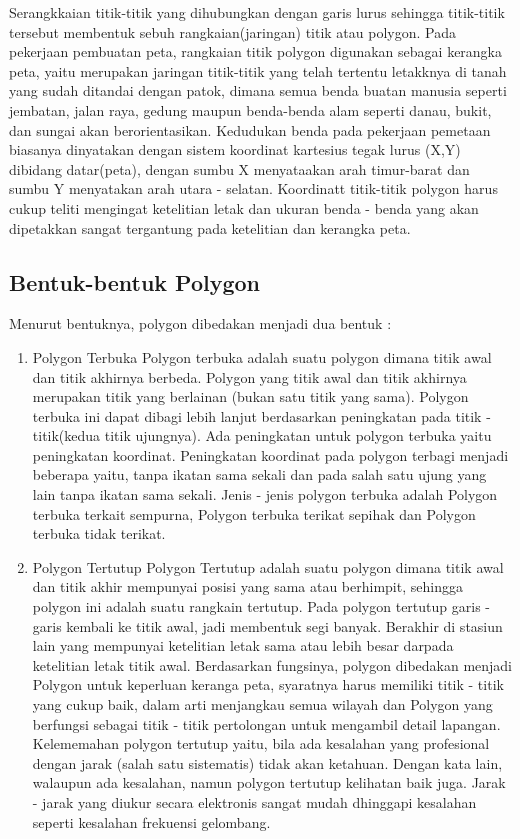 Serangkkaian titik-titik yang dihubungkan dengan garis lurus sehingga titik-titik tersebut membentuk sebuh rangkaian(jaringan) titik atau polygon. Pada pekerjaan pembuatan peta, rangkaian titik polygon digunakan sebagai  kerangka peta, yaitu merupakan jaringan titik-titik yang telah tertentu letakknya di tanah yang sudah ditandai dengan patok, dimana semua benda buatan manusia seperti jembatan, jalan raya, gedung maupun benda-benda alam seperti danau, bukit, dan sungai akan berorientasikan. Kedudukan benda pada pekerjaan pemetaan biasanya dinyatakan dengan sistem koordinat  kartesius tegak lurus (X,Y) dibidang datar(peta), dengan sumbu X menyataakan arah timur-barat dan sumbu Y menyatakan arah utara - selatan. Koordinatt titik-titik polygon harus cukup teliti mengingat ketelitian letak dan ukuran benda - benda yang akan dipetakkan sangat tergantung pada ketelitian dan kerangka peta.

\subsection{Bentuk-bentuk Polygon}
Menurut bentuknya, polygon dibedakan menjadi dua bentuk :
\begin{enumerate}
\item Polygon Terbuka
Polygon terbuka adalah suatu polygon dimana titik awal dan titik akhirnya berbeda. Polygon yang titik awal dan titik akhirnya merupakan titik yang berlainan (bukan satu titik yang sama). Polygon terbuka ini dapat dibagi lebih lanjut berdasarkan peningkatan pada titik - titik(kedua titik ujungnya). Ada peningkatan untuk polygon terbuka yaitu peningkatan koordinat. Peningkatan koordinat pada polygon terbagi menjadi beberapa yaitu, tanpa ikatan sama sekali dan pada salah satu ujung yang lain tanpa ikatan sama sekali. Jenis - jenis polygon terbuka adalah Polygon terbuka terkait sempurna, Polygon terbuka terikat sepihak dan Polygon terbuka tidak terikat.

\item Polygon Tertutup
Polygon Tertutup adalah suatu polygon dimana titik awal dan titik akhir mempunyai posisi yang sama atau berhimpit, sehingga polygon ini adalah suatu rangkain tertutup. Pada polygon tertutup garis - garis kembali ke titik awal, jadi membentuk segi banyak. Berakhir di stasiun lain yang mempunyai ketelitian letak sama atau lebih besar darpada ketelitian letak titik awal.
Berdasarkan fungsinya, polygon dibedakan menjadi Polygon untuk keperluan keranga peta, syaratnya harus memiliki titik - titik yang cukup baik, dalam arti menjangkau semua wilayah dan Polygon yang berfungsi sebagai titik - titik pertolongan untuk mengambil detail lapangan.
Kelememahan polygon tertutup yaitu, bila ada kesalahan yang profesional dengan jarak (salah  satu sistematis) tidak akan ketahuan. Dengan kata lain, walaupun ada kesalahan, namun polygon tertutup kelihatan baik juga. Jarak - jarak yang diukur secara elektronis sangat mudah dhinggapi kesalahan seperti kesalahan frekuensi gelombang.
\end{enumerate}

